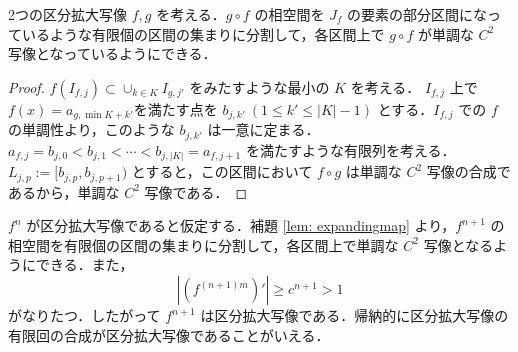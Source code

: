 \documentclass[a4paper,11pt,uplatex]{jsarticle}
\begin{document}
\begin{lemma}\label{lem: expandingmap}\mbox{}\par 
2つの区分拡大写像 $f, g$ を考える．$g\circ f$ の相空間を $J_f$ の要素の部分区間になっているような有限個の区間の集まりに分割して，各区間上で $g\circ f$ が単調な $C^2$ 写像となっているようにできる． 
\end{lemma}
\begin{proof}\mbox{}\par
$f(I_{f,j})\subset \cup_{k\in K}I_{g,j'}$ をみたすような最小の $K$ を考える．
$I_{f,j}$ 上で $f(x) = a_{g,\min{K}+k'}$を満たす点を $b_{j,k'} \ (1 \le k' \le |K|-1)$ とする．$I_{f,j}$ での $f$ の単調性より，このような $b_{j,k'}$ は一意に定まる．$a_{f,j} = b_{j,0} < b_{j,1} < \cdots < b_{j,|K|} = a_{f,j+1}$ を満たすような有限列を考える．$L_{j,p} := [b_{j,p},b_{j,p+1})$ とすると，この区間において $f \circ g$ は単調な $C^2$ 写像の合成であるから，単調な $C^2$ 写像である．
\end{proof}
$f^n$ が区分拡大写像であると仮定する．補題 \ref{lem: expandingmap} より，$f^{n+1}$ の相空間を有限個の区間の集まりに分割して，各区間上で単調な $C^2$ 写像となるようにできる．また，
\begin{equation}
    |(f^{(n+1)m})'| \ge c^{n+1} >1
\end{equation}
がなりたつ．したがって $f^{n+1}$ は区分拡大写像である．帰納的に区分拡大写像の有限回の合成が区分拡大写像であることがいえる．
\end{document}
